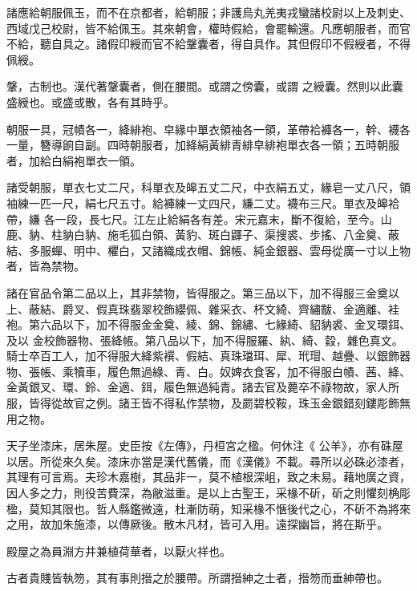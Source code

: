 \begin{pinyinscope}
 諸應給朝服佩玉，而不在京都者，給朝服；非護烏丸羌夷戎蠻諸校尉以上及刺史、西域戊己校尉，皆不給佩玉。其來朝會，權時假給，會罷輸還。凡應朝服者，而官不給，聽自具之。諸假印綬而官不給鞶囊者，得自具作。其但假印不假綬者，不得佩綬。



 鞶，古制也。漢代著鞶囊者，側在腰間。或謂之傍囊，或謂
 之綬囊。然則以此囊盛綬也。或盛或散，各有其時乎。



 朝服一具，冠幘各一，絳緋袍、皁緣中單衣領袖各一領，革帶袷褲各一，幹、襪各一量，簪導餉自副。四時朝服者，加絳絹黃緋青緋皁緋袍單衣各一領；五時朝服者，加給白絹袍單衣一領。



 諸受朝服，單衣七丈二尺，科單衣及皞五丈二尺，中衣絹五丈，緣皂一丈八尺，領袖練一匹一尺，絹七尺五寸。給褲練一丈四尺，縑二丈。襪布三尺。單衣及皞袷帶，縑
 各一段，長七尺。江左止給絹各有差。宋元嘉末，斷不復給，至今。山鹿、豽、柱豽白豽、施毛狐白領、黃豹、斑白鼲子、渠搜裘、步搖、八金奠、蔽結、多服蟬、明中、欋白，又諸織成衣帽、錦帳、純金銀器、雲母從廣一寸以上物者，皆為禁物。



 諸在官品令第二品以上，其非禁物，皆得服之。第三品以下，加不得服三金奠以上、蔽結、爵叉、假真珠翡翠校飾纓佩、雜采衣、杯文綺、齊繡黻、金適離、袿袍。第六品以下，加不得服金金奠、綾、錦、錦繡、七緣綺、貂豽裘、金叉環鉺、及以
 金校飾器物、張絳帳。第八品以下，加不得服羅、紈、綺、縠，雜色真文。騎士卒百工人，加不得服大絳紫襈、假結、真珠璫珥、犀、玳瑁、越疊、以銀飾器物、張帳、乘犢車，履色無過綠、青、白。奴婢衣食客，加不得服白幘、茜、絳、金黃銀叉、環、鈴、金適、鉺，履色無過純青。諸去官及薨卒不祿物故，家人所服，皆得從故官之例。諸王皆不得私作禁物，及罽碧校鞍，珠玉金銀錯刻鏤彫飾無用之物。



 天子坐漆床，居朱屋。史臣按《左傳》，丹桓宮之楹。何休注《
 公羊》，亦有硃屋以居。所從來久矣。漆床亦當是漢代舊儀，而《漢儀》不載。尋所以必硃必漆者，其理有可言焉。夫珍木嘉樹，其品非一，莫不植根深岨，致之未易。藉地廣之資，因人多之力，則役苦費深，為敝滋重。是以上古聖王，采椽不斫，斫之則懼刻桷彫楹，莫知其限也。哲人縣鑑微遠，杜漸防萌，知采椽不愜後代之心，不斫不為將來之用，故加朱施漆，以傳厥後。散木凡材，皆可入用。遠探幽旨，將在斯乎。



 殿屋之為員淵方井兼植荷華者，以厭火祥也。



 古者貴賤皆執笏，其有事則搢之於腰帶。所謂搢紳之士者，搢笏而垂紳帶也。




\end{pinyinscope}
